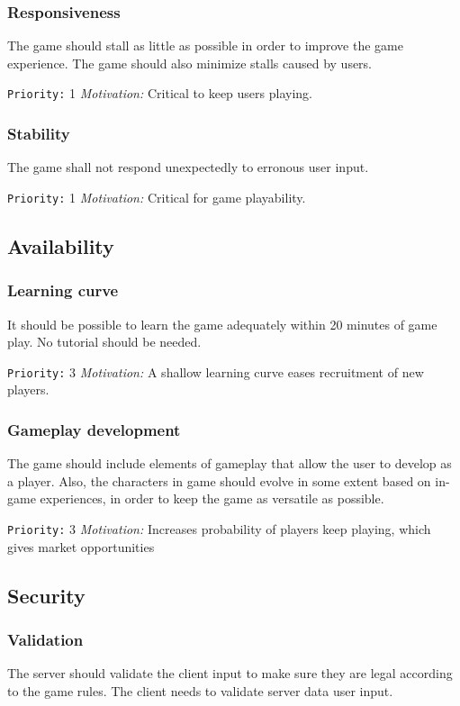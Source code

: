 \documentclass[a4paper,10pt]{article}
\newcommand{\prio}[2]{\texttt{Priority:} #1 \emph{Motivation:} #2}
\begin{document}
\subsubsection{Responsiveness}
The game should stall as little as possible in order to improve the game experience. The game should also minimize stalls caused by users.

\prio{1}{Critical to keep users playing.}

\subsubsection{Stability}
The game shall not respond unexpectedly to erronous user input.

\prio{1}{Critical for game playability.}

\subsection{Availability}
\subsubsection{Learning curve}
It should be possible to learn the game adequately within 20 minutes of game play. No tutorial should be needed.

\prio{3}{A shallow learning curve eases recruitment of new players.}

\subsubsection{Gameplay development}
The game should include elements of gameplay that allow the user to develop as a player. Also, the characters in game should evolve in some extent based on in-game experiences, in order to keep the game as versatile as possible.

\prio{3}{Increases probability of players keep playing, which gives market opportunities}

\subsection{Security}
\subsubsection{Validation}
\label{cheating}
The server should validate the client input to make sure they are legal according to the game rules. The client needs to validate server data user input. 
\end{document}
